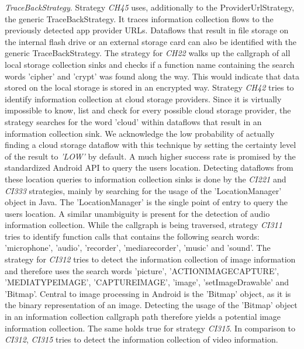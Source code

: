 \textit{TraceBackStrategy}.
Strategy \textit{CH45} uses, additionally to the ProviderUrlStrategy, the generic TraceBackStrategy.
It traces information collection flows to the previously detected app provider URLs.
Dataflows that result in file storage on the internal flash drive or an external storage card can also be identified with the generic TraceBackStrategy.
The strategy for \textit{CH22} walks up the callgraph of all local storage collection sinks and checks if a function name containing the search words 'cipher' and 'crypt' was found along the way.
This would indicate that data stored on the local storage is stored in an encrypted way.
Strategy \textit{CH42} tries to identify information collection at cloud storage providers.
Since it is virtually impossible to know, list and check for every possible cloud storage provider, the strategy searches for the word 'cloud' within dataflows that result in an information collection sink.
We acknowledge the low probability of actually finding a cloud storage dataflow with this technique by setting the certainty level of the result to \textit{'LOW'} by default.
A much higher success rate is promised by the standardized Android API to query the users location.
Detecting dataflows from these location queries to information collection sinks is done by the \textit{CI221} and \textit{CI333} strategies, mainly by searching for the usage of the 'LocationManager' object in Java.
The 'LocationManager' is the single point of entry to query the users location.
A similar unambiguity is present for the detection of audio information collection.
While the callgraph is being traversed, strategy \textit{CI311} tries to identify function calls that contains the following search words: 'microphone', 'audio', 'recorder', 'mediarecorder', 'music' and 'sound'.
The strategy for \textit{CI312} tries to detect the information collection of image information and therefore uses the search words 'picture', 'ACTION\textunderscore IMAGE\textunderscore CAPTURE', 'MEDIA\textunderscore TYPE\textunderscore IMAGE', 'CAPTURE\textunderscore IMAGE', 'image', 'setImageDrawable' and 'Bitmap'.
Central to image processing in Android is the 'Bitmap' object, as it is the binary representation of an image.
Detecting the usage of the 'Bitmap' object in an information collection callgraph path therefore yields a potential image information collection.
The same holds true for strategy \textit{CI315}. 
In comparison to \textit{CI312}, \textit{CI315} tries to detect the information collection of video information.
